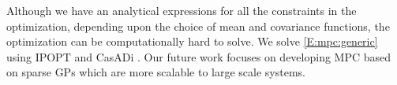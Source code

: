 Although we have an analytical expressions for all the constraints in the optimization, depending upon the choice of mean and covariance functions, the optimization can be computationally hard to solve.
We solve \eqref{E:mpc:generic} using IPOPT \cite{Waechter2009b} and CasADi \cite{Andersson2013b}.
Our future work focuses on developing MPC based on sparse GPs which are more scalable to large scale systems.


